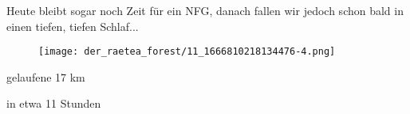  Heute bleibt sogar noch Zeit für ein NFG, danach fallen wir jedoch schon bald in einen tiefen, tiefen Schlaf...
 


\begin{figure}[H]
	\centering
	\texttt{[image: der\_raetea\_forest/11\_1666810218134476-4.png]}
	\caption{}
	\label{fig:11_1666810218134476-4}
\end{figure}

  gelaufene 17 km
 


  in etwa 11 Stunden
 

